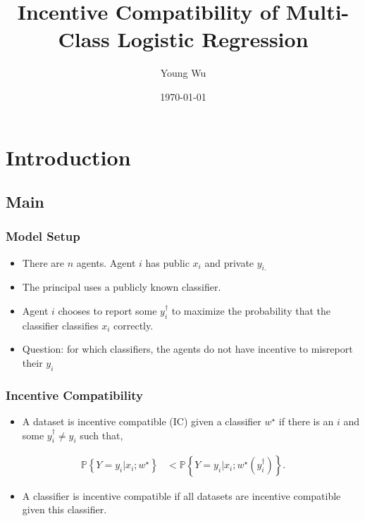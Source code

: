 \documentclass{beamer}
\title{Incentive Compatibility of Multi-Class Logistic Regression}
\author{Young Wu}
\date{\today}
\begin{document}
\newtheorem{thm}{Theorem}
\newtheorem{cor}{Corollary}
\newtheorem{lem}{Lemma}
\newtheorem{prop}{Proposition}
\newtheorem{conj}{Conjecture}
\newtheorem{algo}{Algorithm}
\newtheorem{obs}{Observation}
\newtheorem{clm}{Claim}
\theoremstyle{definition}
\newtheorem{df}{Definition}
\newtheorem{eg}{Example}
\newtheorem{asm}{Assumption}
\newtheorem{cond}{Condition}
\theoremstyle{remark}
\newtheorem{rmk}{Remark}
\begin{frame} \titlepage \end{frame}


\section{Introduction} \subsection{Main}

\begin{frame} \frametitle{Model Setup}
\begin{itemize}
\item There are $n $ agents. Agent $i $ has public $x_{i}$ and private $y_{i.}$
\item The principal uses a publicly known classifier.
\item Agent $i $ chooses to report some $y^{\dagger}_{i}$ to maximize the probability that the classifier classifies $x_{i}$ correctly.
\item Question: for which classifiers, the agents do not have incentive to misreport their $y_{i}$
\end{itemize}
\end{frame}

\begin{frame} \frametitle{Incentive Compatibility}
\begin{itemize}
\item A dataset is incentive compatible (IC) given a classifier $w^\star $ if there is an $i $ and some $y^{\dagger}_{i} \neq  y_{i}$ such that,
\end{itemize}\begin{align*}
\mathbb{P}\left\{Y = y_{i} | x_{i} ; w^\star \right\} &< \mathbb{P}\left\{Y = y_{i} | x_{i} ; w^\star \left(y^{\dagger}_{i}\right)\right\}.
\end{align*}
\begin{itemize}
\item A classifier is incentive compatible if all datasets are incentive compatible given this classifier.
\end{itemize}
\end{frame}
\end{document}
